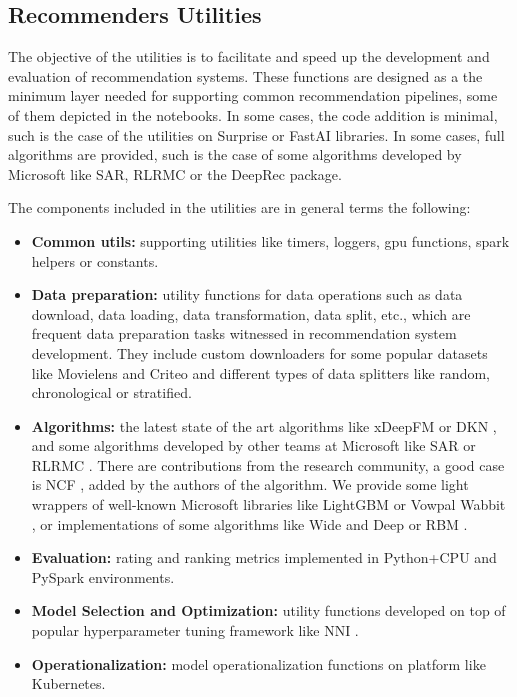 \subsection{Recommenders Utilities}

The objective of the utilities is to facilitate and speed up the development and evaluation of recommendation systems.
These functions are designed as a the minimum layer needed for supporting common recommendation pipelines, some of 
them depicted in the notebooks. 
In some cases, the code addition is minimal, such is the case of the utilities on Surprise \cite{Surprise} or 
FastAI \cite{howard2018fastai} libraries. In some cases, full algorithms are provided, such is the case of 
some algorithms developed by Microsoft like SAR, RLRMC or the DeepRec package.

The components included in the utilities are in general terms the following: 
\begin{itemize}
    \item \textbf{Common utils:} supporting utilities like timers, loggers, gpu functions, 
    spark helpers or constants.
    \item \textbf{Data preparation:} utility functions for data operations 
    such as data download, data loading, data transformation, data split, etc., which are frequent data preparation 
    tasks witnessed in recommendation system development. They include custom downloaders for some
    popular datasets like Movielens and Criteo and different types of data splitters like random, chronological or
    stratified.     
    \item \textbf{Algorithms:} the latest state of
    the art algorithms like xDeepFM \cite{lian2018xdeepfm} or DKN \cite{wang2018dkn}, and some algorithms developed by other
    teams at Microsoft like SAR \cite{diev2015sar} or RLRMC \cite{rlrmc}. There are contributions from the research community, a good case is NCF 
    \cite{he2017neural}, added by the authors of the algorithm. We provide some light wrappers of well-known Microsoft
    libraries like LightGBM \cite{ke2017lightgbm} or Vowpal Wabbit \cite{agarwal2014reliable}, or implementations
    of some algorithms like Wide and Deep \cite{cheng2016wide} or RBM \cite{salakhutdinov2007restricted}. 
    \item \textbf{Evaluation:} rating and ranking metrics implemented in Python+CPU and PySpark environments.
    \item \textbf{Model Selection and Optimization:} utility functions developed on top of popular hyperparameter 
    tuning framework like NNI \cite{nni}. 
    \item \textbf{Operationalization:} model operationalization functions on platform like Kubernetes.
\end{itemize}
    

